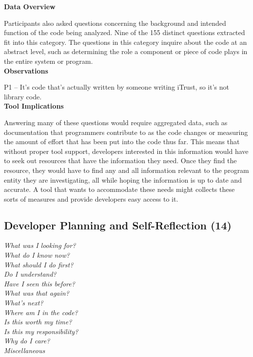 \documentclass[conference]{IEEEtran}
\begin{document}
\noindent\textbf{Data Overview}

Participants also asked questions concerning the background and intended function of the code being analyzed. 
Nine of the 155 distinct questions extracted fit into this category. 
The questions in this category inquire about the code at an abstract level, such as determining the role a component or piece of code plays in the entire system or program.
\\

\noindent\textbf{Observations}

P1 -- It's code that's actually written by someone writing iTrust, so it's not library code.
\\

\noindent\textbf{Tool Implications}

Answering many of these questions would require aggregated data, such as documentation that programmers contribute to as the code changes or measuring the amount of effort that has been put into the code thus far.
This means that without proper tool support, developers interested in this information would have to seek out resources that have the information they need. 
Once they find the resource, they would have to find any and all information relevant to the program entity they are investigating, all while hoping the information is up to date and accurate. 
A tool that wants to accommodate these needs might collects these sorts of measures and provide developers easy access to it.

\noindent\subsection{\textbf{Developer Planning and Self-Reflection (14)}} \label{dpr}

\noindent\emph{What was I looking for?} \\
\emph{What do I know now?} \\
\emph{What should I do first?} \\
\emph{Do I understand?} \\
\emph{Have I seen this before?} \\
\emph{What was that again?} \\
\emph{What's next?} \\
\emph{Where am I in the code?} \\
\emph{Is this worth my time?} \\
\emph{Is this my responsibility?} \\
\emph{Why do I care?} \\
\emph{Miscellaneous} \\
\end{document}
